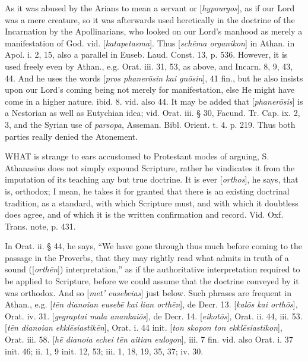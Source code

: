 As it was abused by the Arians to mean a servant
or [\emph{hypourgos}], as if our Lord was a mere creature, so it was
afterwards used heretically in the doctrine of the Incarnation by the
Apollinarians, who looked on our Lord's manhood as merely a
manifestation of God. vid. [\emph{katapetasma}]. Thus [\emph{sch\={e}ma
organikon}] in Athan. in Apol. i. 2, 15, also a parallel in Euseb.
Laud. Const. 13, p. 536. However, it is used freely even by Athan.,
e.g. Orat. iii. 31, 53, as above, and Incarn. 8, 9, 43, 44. And he
uses the words [\emph{pros phaner\={o}sin kai gn\={o}sin}], 41
fin., but he also insists upon our Lord's coming being not merely for
manifestation, else He might have come in a higher nature. ibid.
8. vid. also 44. It may be added that [\emph{phaner\={o}sis}] is a
Nestorian as well as Eutychian idea; vid. Orat. iii. § 30, Facund.
Tr. Cap. ix. 2, 3, and the Syrian use of \emph{parsopa}, Asseman.
Bibl. Orient. t. 4. p. 219. Thus both parties really denied the
Atonement.

\xsection{[Orthos]}

WHAT
is strange to ears accustomed to Protestant modes of arguing, S.
Athanasius does not simply expound Scripture, rather he vindicates it
from the imputation of its teaching any but true doctrine. It is ever
[\emph{orthos}], he says, that is, orthodox; I mean, he takes it for
granted that there is an existing doctrinal tradition, as a standard,
with which Scripture must, and with which it doubtless does agree, and
of which it is the written confirmation and record. Vid. Oxf. Trans.
note, p. 431.

In Orat. ii. § 44, he says, ``We have gone
through thus much before coming to the passage in the Proverbs, that
they may rightly read what admits in truth of a sound ([\emph{orth\={e}n}])
interpretation,'' as if the authoritative interpretation required to be
applied to Scripture, before we could assume that the doctrine
conveyed by it was orthodox. And so [\emph{met'
eusebeias}] just below. Such phrases are frequent in Athan.,
e.g. [\emph{t\={e}n dianoian euseb\={e} kai lian orth\={e}n}],
de Decr. 13. [\emph{kal\={o}s kai orth\={o}s}], Orat. iv. 31. [\emph{gegraptai
mala anankai\={o}s}], de Decr. 14. [\emph{eikot\={o}s}], Orat.
ii. 44, iii. 53. [\emph{t\={e}n dianoian ekkl\={e}siastik\={e}n}],
Orat. i. 44 init. [\emph{ton skopon ton ekkl\={e}siastikon}], Orat.
iii. 58. [\emph{h\={e} dianoia echei t\={e}n aitian eulogon}],
iii. 7 fin. vid. also Orat. i. 37 init. 46; ii. 1, 9 init. 12, 53;
iii. 1, 18, 19, 35, 37; iv. 30.


